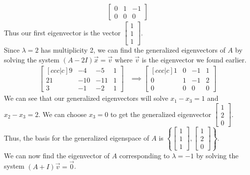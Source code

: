 \documentclass[answers,12pt,addpoints]{exam}
\begin{document}
\begin{questions}
\begin{solution}
\begin{align*}
\begin{bmatrix}
            0 & 1 & -1 \\
            0 & 0 & 0
        \end{bmatrix}
        \end{align*}
        Thus our first eigenvector is the vector $\begin{bmatrix} 1\\ 1\\ 1 \end{bmatrix}$. \\
        Since $\lambda = 2$ has multiplicity 2, we can find the generalized eigenvectors of $A$ by solving the system $(A - 2I)\vec{x} = \vec{v}$ where $\vec{v}$ is the eigenvector we found earlier.
        \begin{align*}
            \begin{bmatrix}[ccc|c]
                9 & -4 & -5 & 1 \\
                21 & -10 & -11 & 1 \\
                3 & -1 & -2 & 1
            \end{bmatrix}
            &\implies
            \begin{bmatrix}[ccc|c]
                1 & 0 & -1 & 1 \\
                0 & 1 & -1 & 2 \\
                0 & 0 & 0 & 0
            \end{bmatrix}
        \end{align*}
        We can see that our generalized eigenvectors will solve $x_1 - x_3 = 1$ and $x_2 - x_3 = 2$. We can choose $x_3 = 0$ to get the generalized eigenvector $\begin{bmatrix} 1\\ 2\\ 0 \end{bmatrix}$. \\
        Thus, the basis for the generalized eigenspace of $A$ is $\left\{ \begin{bmatrix} 1\\ 1\\ 1 \end{bmatrix}, \begin{bmatrix} 1\\ 2\\ 0 \end{bmatrix} \right\}$. \\
        We can now find the eigenvector of $A$ corresponding to $\lambda = -1$ by solving the system $(A + I)\vec{v} = \vec{0}$.
        \begin{align*}

\end{align*}
\end{solution}
\end{questions}
\end{document}
